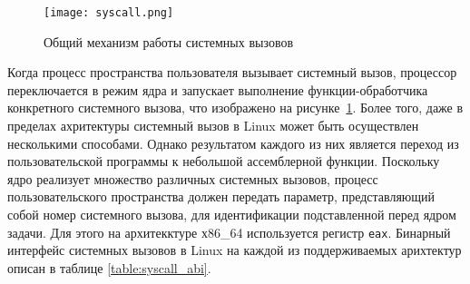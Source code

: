 \begin{figure}
  \centering
  \texttt{[image: syscall.png]}
  \caption{Общий механизм работы системных вызовов}
  \label{fig:syscall}
\end{figure}

Когда процесс пространства пользователя вызывает системный вызов, процессор
переключается в режим ядра и запускает выполнение функции-обработчика
конкретного системного вызова, что изображено на рисунке~\ref{fig:syscall}.
Более того, даже в пределах ахритектуры системный вызов в Linux может быть
осуществлен несколькими способами. Однако результатом каждого из них является
переход из пользовательской программы к небольшой ассемблерной функции.
Поскольку ядро реализует множество различных системных вызовов, процесс
пользовательского пространства должен передать параметр, представляющий собой
номер системного вызова, для идентификации подставленной перед ядром задачи. Для
этого на архитекктуре х86\_64 используется регистр \texttt{eax}. Бинарный
интерфейс системных вызовов в Linux на каждой из поддерживаемых арихтектур
описан в таблице \ref{table:syscall_abi}.

